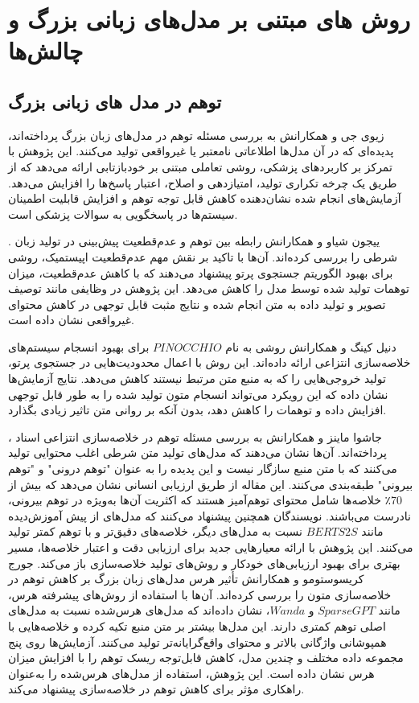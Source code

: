 \section{روش های مبتنی بر مدل‌های زبانی بزرگ و چالش‌ها}
\subsection{توهم در مدل ‌های زبانی بزرگ}
 زیوی جی و همکارانش به بررسی مسئله توهم در مدل‌های زبان بزرگ پرداخته‌اند، پدیده‌ای که در آن مدل‌ها اطلاعاتی نامعتبر یا غیرواقعی تولید می‌کنند. این پژوهش با تمرکز بر کاربردهای پزشکی، روشی تعاملی مبتنی بر خودبازتابی ارائه می‌دهد که از طریق یک چرخه تکراری تولید، امتیازدهی و اصلاح، اعتبار پاسخ‌ها را افزایش می‌دهد. آزمایش‌های انجام شده نشان‌دهنده کاهش قابل توجه توهم و افزایش قابلیت اطمینان سیستم‌ها در پاسخگویی به سوالات پزشکی است\cite{ji-etal-2023-towards}​.

. ییجون شیاو و همکارانش رابطه بین توهم و عدم‌قطعیت پیش‌بینی در تولید زبان شرطی را بررسی کرده‌اند. آن‌ها با تاکید بر نقش مهم عدم‌قطعیت اپیستمیک، روشی برای بهبود الگوریتم جستجوی پرتو پیشنهاد می‌دهند که با کاهش عدم‌قطعیت، میزان توهمات تولید شده توسط مدل را کاهش می‌دهد. این پژوهش در وظایفی مانند توصیف تصویر و تولید داده به متن انجام شده و نتایج مثبت قابل توجهی در کاهش محتوای غیرواقعی نشان داده است\cite{xiao-wang-2021-hallucination}.

 دنیل کینگ و همکارانش روشی به نام $PINOCCHIO$ برای بهبود انسجام سیستم‌های خلاصه‌سازی انتزاعی ارائه داده‌اند. این روش با اعمال محدودیت‌هایی در جستجوی پرتو، تولید خروجی‌هایی را که به منبع متن مرتبط نیستند کاهش می‌دهد. نتایج آزمایش‌ها نشان داده که این رویکرد می‌تواند انسجام متون تولید شده را به طور قابل توجهی افزایش داده و توهمات را کاهش دهد، بدون آنکه بر روانی متن تاثیر زیادی بگذارد\cite{king-etal-2022-dont}​.

، جاشوا ماینز و همکارانش به بررسی مسئله توهم در خلاصه‌سازی انتزاعی اسناد پرداخته‌اند. آن‌ها نشان می‌دهند که مدل‌های تولید متن شرطی اغلب محتوایی تولید می‌کنند که با متن منبع سازگار نیست و این پدیده را به عنوان "توهم درونی" و "توهم بیرونی" طبقه‌بندی می‌کنند. این مقاله از طریق ارزیابی انسانی نشان می‌دهد که بیش از 70٪ خلاصه‌ها شامل محتوای توهم‌آمیز هستند که اکثریت آن‌ها به‌ویژه در توهم بیرونی، نادرست می‌باشند. نویسندگان همچنین پیشنهاد می‌کنند که مدل‌های از پیش آموزش‌دیده مانند $BERTS2S$ نسبت به مدل‌های دیگر، خلاصه‌های دقیق‌تر و با توهم کمتر تولید می‌کنند. این پژوهش با ارائه معیارهایی جدید برای ارزیابی دقت و اعتبار خلاصه‌ها، مسیر بهتری برای بهبود ارزیابی‌های خودکار و روش‌های تولید خلاصه‌سازی باز می‌کند​\cite{maynez-etal-2020-faithfulness}.
 جورج کریسوستومو و همکارانش تأثیر هرس مدل‌های زبان بزرگ بر کاهش توهم در خلاصه‌سازی متون را بررسی کرده‌اند. آن‌ها با استفاده از روش‌های پیشرفته هرس، مانند $SparseGPT$ و $Wanda$، نشان داده‌اند که مدل‌های هرس‌شده نسبت به مدل‌های اصلی توهم کمتری دارند. این مدل‌ها بیشتر بر متن منبع تکیه کرده و خلاصه‌هایی با همپوشانی واژگانی بالاتر و محتوای واقع‌گرایانه‌تر تولید می‌کنند. آزمایش‌ها روی پنج مجموعه داده مختلف و چندین مدل، کاهش قابل‌توجه ریسک توهم را با افزایش میزان هرس نشان داده است. این پژوهش، استفاده از مدل‌های هرس‌شده را به‌عنوان راهکاری مؤثر برای کاهش توهم در خلاصه‌سازی پیشنهاد می‌کند.
 
